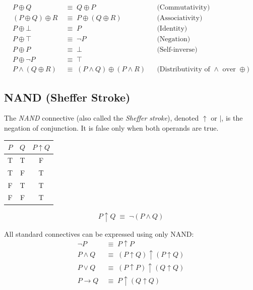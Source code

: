 \begin{theorem}
\begin{align*}
P \oplus Q &\;\equiv\; Q \oplus P && \text{(Commutativity)} \\
(P \oplus Q) \oplus R &\;\equiv\; P \oplus (Q \oplus R) && \text{(Associativity)} \\
P \oplus \bot &\;\equiv\; P && \text{(Identity)} \\
P \oplus \top &\;\equiv\; \neg P && \text{(Negation)} \\
P \oplus P &\;\equiv\; \bot && \text{(Self-inverse)} \\
P \oplus \neg P &\;\equiv\; \top && \\
P \wedge (Q \oplus R) &\;\equiv\; (P \wedge Q) \oplus (P \wedge R) && \text{(Distributivity of $\wedge$ over $\oplus$)}
\end{align*}
\end{theorem}

\subsection{NAND (Sheffer Stroke)}

\begin{definition}[NAND]
The \emph{NAND} connective (also called the \emph{Sheffer stroke}), denoted
$\uparrow$ or $|$, is the negation of conjunction. It is false only when both
operands are true.

\begin{center}
\renewcommand{\arraystretch}{1.2}
\begin{tabular}{|c|c||c|}
\hline
$P$ & $Q$ & $P \uparrow Q$ \\
\hline
T & T & F \\
T & F & T \\
F & T & T \\
F & F & T \\
\hline
\end{tabular}
\end{center}
\end{definition}

\begin{theorem}
\[
P \uparrow Q \;\equiv\; \neg(P \wedge Q)
\]
\end{theorem}

\begin{theorem}
All standard connectives can be expressed using only NAND:
\begin{align*}
\neg P &\;\equiv\; P \uparrow P \\
P \wedge Q &\;\equiv\; (P \uparrow Q) \uparrow (P \uparrow Q) \\
P \vee Q &\;\equiv\; (P \uparrow P) \uparrow (Q \uparrow Q) \\
P \rightarrow Q &\;\equiv\; P \uparrow (Q \uparrow Q)
\end{align*}
\end{theorem}

